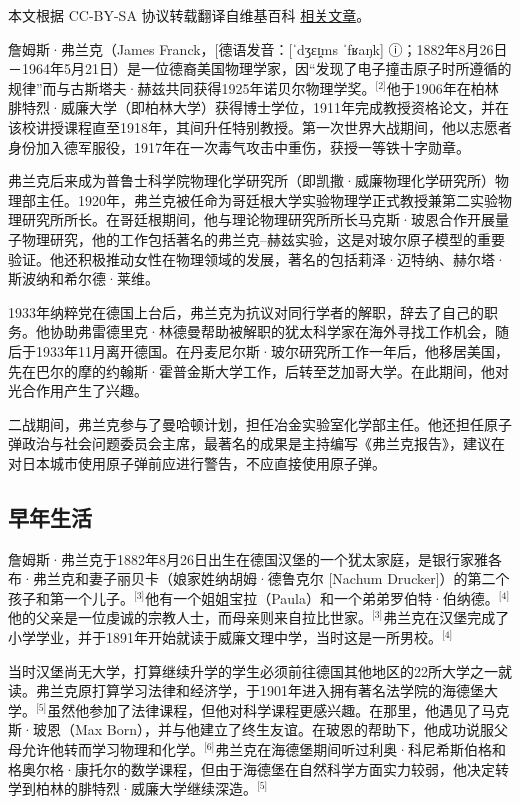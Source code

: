
本文根据 CC-BY-SA 协议转载翻译自维基百科 \href{https://en.wikipedia.org/wiki/James_Franck}{相关文章}。

詹姆斯·弗兰克（James Franck，[德语发音：[ˈdʒɛɪ̯ms ˈfʁaŋk] ⓘ；1882年8月26日－1964年5月21日）是一位德裔美国物理学家，因“发现了电子撞击原子时所遵循的规律”而与古斯塔夫·赫兹共同获得1925年诺贝尔物理学奖。\(^\text{[2]}\)他于1906年在柏林腓特烈·威廉大学（即柏林大学）获得博士学位，1911年完成教授资格论文，并在该校讲授课程直至1918年，其间升任特别教授。第一次世界大战期间，他以志愿者身份加入德军服役，1917年在一次毒气攻击中重伤，获授一等铁十字勋章。

弗兰克后来成为普鲁士科学院物理化学研究所（即凯撒·威廉物理化学研究所）物理部主任。1920年，弗兰克被任命为哥廷根大学实验物理学正式教授兼第二实验物理研究所所长。在哥廷根期间，他与理论物理研究所所长马克斯·玻恩合作开展量子物理研究，他的工作包括著名的弗兰克–赫兹实验，这是对玻尔原子模型的重要验证。他还积极推动女性在物理领域的发展，著名的包括莉泽·迈特纳、赫尔塔·斯波纳和希尔德·莱维。

1933年纳粹党在德国上台后，弗兰克为抗议对同行学者的解职，辞去了自己的职务。他协助弗雷德里克·林德曼帮助被解职的犹太科学家在海外寻找工作机会，随后于1933年11月离开德国。在丹麦尼尔斯·玻尔研究所工作一年后，他移居美国，先在巴尔的摩的约翰斯·霍普金斯大学工作，后转至芝加哥大学。在此期间，他对光合作用产生了兴趣。

二战期间，弗兰克参与了曼哈顿计划，担任冶金实验室化学部主任。他还担任原子弹政治与社会问题委员会主席，最著名的成果是主持编写《弗兰克报告》，建议在对日本城市使用原子弹前应进行警告，不应直接使用原子弹。
\subsection{早年生活}
詹姆斯·弗兰克于1882年8月26日出生在德国汉堡的一个犹太家庭，是银行家雅各布·弗兰克和妻子丽贝卡（娘家姓纳胡姆·德鲁克尔 [Nachum Drucker]）的第二个孩子和第一个儿子。\(^\text{[3]}\)他有一个姐姐宝拉（Paula）和一个弟弟罗伯特·伯纳德。\(^\text{[4]}\)他的父亲是一位虔诚的宗教人士，而母亲则来自拉比世家。\(^\text{[3]}\)弗兰克在汉堡完成了小学学业，并于1891年开始就读于威廉文理中学，当时这是一所男校。\(^\text{[4]}\)

当时汉堡尚无大学，打算继续升学的学生必须前往德国其他地区的22所大学之一就读。弗兰克原打算学习法律和经济学，于1901年进入拥有著名法学院的海德堡大学。\(^\text{[5]}\)虽然他参加了法律课程，但他对科学课程更感兴趣。在那里，他遇见了马克斯·玻恩（Max Born），并与他建立了终生友谊。在玻恩的帮助下，他成功说服父母允许他转而学习物理和化学。\(^\text{[6]}\)弗兰克在海德堡期间听过利奥·科尼希斯伯格和格奥尔格·康托尔的数学课程，但由于海德堡在自然科学方面实力较弱，他决定转学到柏林的腓特烈·威廉大学继续深造。\(^\text{[5]}\)

